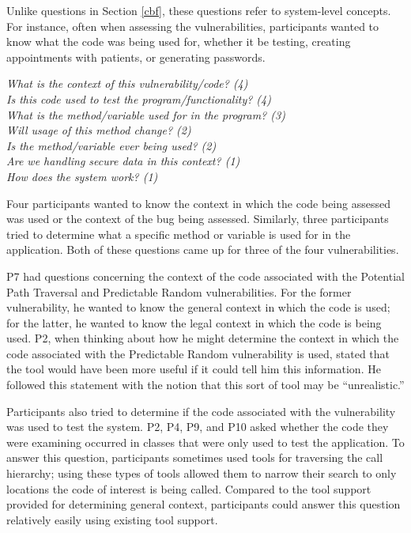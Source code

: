 \documentclass{acm_proc_article-sp}
\begin{document}
Unlike questions in Section \ref{cbf}, these questions refer to system-level concepts.
For instance, often when assessing the vulnerabilities, participants wanted to know what the code was being used for, whether it be testing, creating appointments with patients, or generating passwords.


\noindent\emph{What is the context of this vulnerability/code? (4)} \\
\emph{Is this code used to test the program/functionality? (4)} \\
\emph{What is the method/variable used for in the program? (3)} \\
\emph{Will usage of this method change? (2)} \\
\emph{Is the method/variable ever being used? (2)} \\
\emph{Are we handling secure data in this context? (1)} \\
\emph{How does the system work? (1)} 


 
Four participants wanted to know the context in which the code being assessed was used or the context of the bug being assessed.
Similarly, three participants tried to determine what a specific method or variable is used for in the application.
Both of these questions came up for three of the four vulnerabilities.


P7 had questions concerning the context of the code associated with the Potential Path Traversal and Predictable Random vulnerabilities.
For the former vulnerability, he wanted to know the general context in which the code is used; for the latter, he wanted to know the legal context in which the code is being used.
P2, when thinking about how he might determine the context in which the code associated with the Predictable Random vulnerability is used, stated that the tool would have been more useful if it could tell him this information.
He followed this statement with the notion that this sort of tool may be ``unrealistic.'' 

Participants also tried to determine if the code associated with the vulnerability was used to test the system. 
P2, P4, P9, and P10 asked whether the code they were examining occurred in classes that were only used to test the application. 
To answer this question, participants sometimes used tools for traversing the call hierarchy; using these types of tools allowed them to narrow their search to only locations the code of interest is being called.
Compared to the tool support provided for determining general context, participants could answer this question relatively easily using existing tool support.
\end{document}
